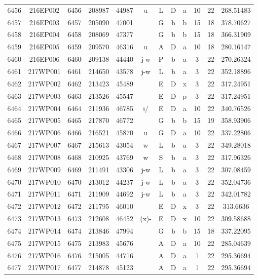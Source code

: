 \begin{tabular}{|*{12}{c|}}
6456 & 216EP002 & 6456 & 208987 & 44987 & u & L & D & a & 10 & 22 & 268.51483 \\ 
6457 & 216EP003 & 6457 & 205090 & 47001 &  & G & b & b & 15 & 18 & 378.70627 \\ 
6458 & 216EP004 & 6458 & 208069 & 47377 &  & G & b & b & 15 & 18 & 366.31909 \\ 
6459 & 216EP005 & 6459 & 209570 & 46316 & u & A & D & a & 10 & 18 & 280.16147 \\ 
6460 & 216EP006 & 6460 & 209138 & 44440 & j-w & P & b & a & 3 & 22 & 270.26324 \\ 
6461 & 217WP001 & 6461 & 214650 & 43578 & j-w & L & b & a & 3 & 22 & 352.18896 \\ 
6462 & 217WP002 & 6462 & 213423 & 45489 &  & E & D & x & 3 & 22 & 317.24951 \\ 
6463 & 217WP003 & 6463 & 213526 & 45547 &  & E & D & p & 3 & 22 & 317.24951 \\ 
6464 & 217WP004 & 6464 & 211936 & 46785 & i/ & E & D & a & 10 & 22 & 340.76526 \\ 
6465 & 217WP005 & 6465 & 217870 & 46772 &  & G & b & b & 15 & 19 & 358.93906 \\ 
6466 & 217WP006 & 6466 & 216521 & 45870 & u & G & D & a & 10 & 22 & 337.22806 \\ 
6467 & 217WP007 & 6467 & 215613 & 43054 & w & L & b & a & 3 & 22 & 349.28018 \\ 
6468 & 217WP008 & 6468 & 210925 & 43769 & w & S & b & a & 3 & 22 & 317.96326 \\ 
6469 & 217WP009 & 6469 & 211491 & 43306 & j-w & L & b & a & 3 & 22 & 307.08459 \\ 
6470 & 217WP010 & 6470 & 213012 & 44237 & j-w & L & b & a & 3 & 22 & 352.04736 \\ 
6471 & 217WP011 & 6471 & 211909 & 44692 & j-w & L & b & a & 3 & 22 & 342.01782 \\ 
6472 & 217WP012 & 6472 & 211795 & 46010 &  & E & D & x & 3 & 22 & 313.6636 \\ 
6473 & 217WP013 & 6473 & 212608 & 46452 & (x)- & E & D & x & 10 & 22 & 309.58688 \\ 
6474 & 217WP014 & 6474 & 213846 & 47994 &  & G & b & b & 15 & 18 & 337.22095 \\ 
6475 & 217WP015 & 6475 & 213983 & 45676 &  & A & D & a & 10 & 22 & 285.04639 \\ 
6476 & 217WP016 & 6476 & 215005 & 44716 &  & A & D & a & 1 & 22 & 295.36694 \\ 
6477 & 217WP017 & 6477 & 214878 & 45123 &  & A & D & a & 1 & 22 & 295.36694 \\ 

\end{tabular}
